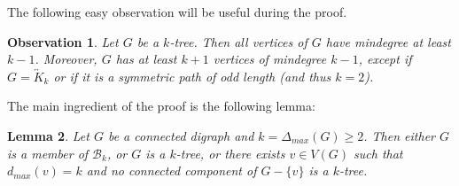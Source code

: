 \documentclass[11pt]{article}
\newtheorem{lemma}{Lemma}[section]
\newtheorem{observation}[lemma]{Observation}
\newcommand{\olra}{\overleftrightarrow}
\begin{document}
The following easy observation will be useful during the proof. 
\begin{observation}\label{obs_1}
Let $G$ be a $k$-tree. 
Then all vertices of $G$ have mindegree at least $k-1$. Moreover, $G$ has at least $k+1$ vertices of mindegree $k-1$, except if $G = \olra{K}_{k}$ or if it is a symmetric path of odd length (and thus $k=2$). 
\end{observation}

The main ingredient of the proof is the following lemma:

\begin{lemma}\label{lem:ktree}
Let $G$ be a connected digraph and $k = \Delta_{max}(G) \geq 2$. 
Then either $G$ is a member of $\mathcal B_k$, or $G$ is a $k$-tree, or there exists $v \in V(G)$ such that $d_{max}(v) = k$ and no connected component of $G - \{v\}$ is a $k$-tree. 
\end{lemma}
\end{document}
